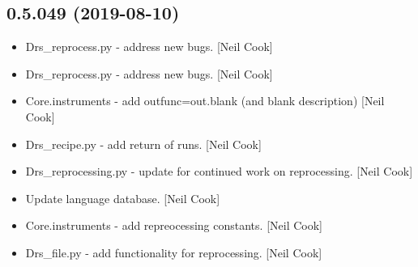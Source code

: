\documentclass[a4paper,10pt,english]{report}
\begin{document}
\subsection{0.5.049 (2019-08-10)}
\label{\detokenize{misc/changelog:id92}}\begin{itemize}
\item {} 
Drs\_reprocess.py - address new bugs. {[}Neil Cook{]}

\item {} 
Drs\_reprocess.py - address new bugs. {[}Neil Cook{]}

\item {} 
Core.instruments - add outfunc=out.blank (and blank description) {[}Neil
Cook{]}

\item {} 
Drs\_recipe.py - add return of runs. {[}Neil Cook{]}

\item {} 
Drs\_reprocessing.py - update for continued work on reprocessing. {[}Neil
Cook{]}

\item {} 
Update language database. {[}Neil Cook{]}

\item {} 
Core.instruments - add repreocessing constants. {[}Neil Cook{]}

\item {} 
Drs\_file.py - add functionality for reprocessing. {[}Neil Cook{]}

\end{itemize}
\end{document}
